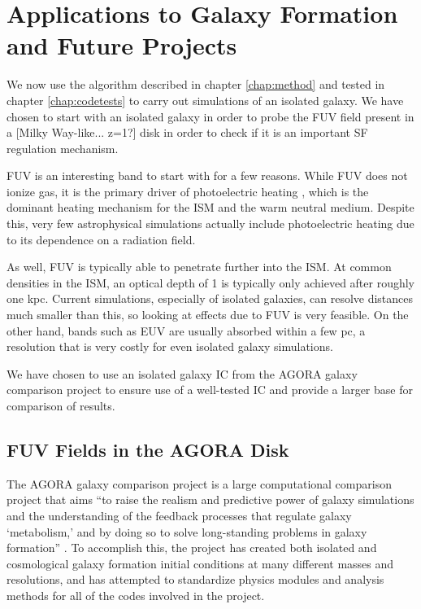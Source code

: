 \pagestyle{fancy}
\headheight 20pt
\chead{}
\lfoot{}
\cfoot{\thepage}
\rfoot{}
\renewcommand{\headrulewidth}{0.1pt}
\renewcommand{\footrulewidth}{0.1pt}

\chapter{Applications to Galaxy Formation and Future Projects}
\label{chap:galaxyformation}
\thispagestyle{fancy}

We now use the algorithm described in chapter \ref{chap:method} and tested in chapter \ref{chap:codetests} to carry out simulations of an isolated galaxy. We have chosen to start with an isolated galaxy in order to probe the FUV field present in a [Milky Way-like... z=1?] disk in order to check if it is an important SF regulation mechanism.

FUV is an interesting band to start with for a few reasons. While FUV does not ionize gas, it is the primary driver of photoelectric heating \citep{tielens05}, which is the dominant heating mechanism for the ISM and the warm neutral medium. Despite this, very few astrophysical simulations actually include photoelectric heating due to its dependence on a radiation field.

As well, FUV is typically able to penetrate further into the ISM. At common densities in the ISM, an optical depth of 1 is typically only achieved after roughly one kpc. Current simulations, especially of isolated galaxies, can resolve distances much smaller than this, so looking at effects due to FUV is very feasible. On the other hand, bands such as EUV are usually absorbed within a few pc, a resolution that is very costly for even isolated galaxy simulations.

We have chosen to use an isolated galaxy IC from the AGORA galaxy comparison project \citep{kimEt14} to ensure use of a well-tested IC and provide a larger base for comparison of results.

\section{FUV Fields in the AGORA Disk}
\label{sec:agora}

The AGORA galaxy comparison project is a large computational comparison project that aims ``to raise the realism and predictive power of galaxy simulations and the understanding of the feedback processes that regulate galaxy `metabolism,' and by doing so to solve long-standing problems in galaxy formation'' \citep{kimEt14}. To accomplish this, the project has created both isolated and cosmological galaxy formation initial conditions at many different masses and resolutions, and has attempted to standardize physics modules and analysis methods for all of the codes involved in the project.

